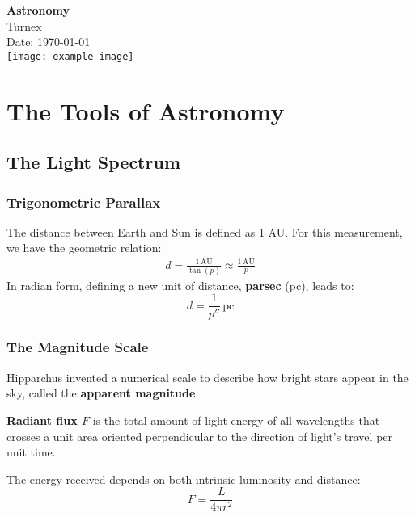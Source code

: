 \documentclass[12pt,a4paper]{book}
\begin{document}
	
	\begin{titlepage}
		\centering
		{\Huge \textbf{Astronomy}} \\
		[2cm] %
		\vfill
		{\large Turnex} \\
		[1cm] %
		{\large Date: \today} \\
		[2cm] %
		\vfill
		\texttt{[image: example-image]} %
		\vfill
	\end{titlepage}
	
	\tableofcontents
	\newpage
	
	\chapter{The Tools of Astronomy}
	\section{The Light Spectrum}
	\subsection{Trigonometric Parallax}
	
	The distance between Earth and Sun is defined as 1 AU. For this measurement, we have the geometric relation:
	\begin{gather}
		d = \frac{1 \, \text{AU}}{\tan(p)} \approx \frac{1 \, \text{AU}}{p}
	\end{gather}
	In radian form, defining a new unit of distance, \textbf{parsec} (pc), leads to:
	\begin{equation}
		d = \frac{1}{p''} \, \text{pc}
	\end{equation}
	
	\subsection{The Magnitude Scale}
	Hipparchus invented a numerical scale to describe how bright stars appear in the sky, called the \textbf{apparent magnitude}.
	
	\textbf{Radiant flux \( F \)} is the total amount of light energy of all wavelengths that crosses a unit area oriented perpendicular to the direction of light’s travel per unit time.
	
	The energy received depends on both intrinsic luminosity and distance:
	\begin{equation}
		F = \frac{L}{4 \pi r^2}
	\end{equation}
	
\end{document}

